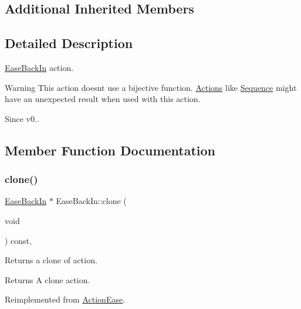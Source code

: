 \subsection*{Additional Inherited Members}


\subsection{Detailed Description}
\hyperlink{classEaseBackIn}{Ease\+Back\+In} action. 

\begin{DoxyWarning}{Warning}
This action doesn\textquotesingle{}t use a bijective function. \hyperlink{classActions}{Actions} like \hyperlink{classSequence}{Sequence} might have an unexpected result when used with this action. 
\end{DoxyWarning}
\begin{DoxySince}{Since}
v0.. 
\end{DoxySince}


\subsection{Member Function Documentation}
\mbox{\label{classEaseBackIn_a2f409b8e89fc64d521a6268ff701045d}} 
\subsubsection{\texorpdfstring{clone()}{clone()}}
{\footnotesize\ttfamily \hyperlink{classEaseBackIn}{Ease\+Back\+In} $\ast$ Ease\+Back\+In\+::clone (\begin{DoxyParamCaption}\item[{void}]{ }\end{DoxyParamCaption}) const\hspace{0.3cm}{\ttfamily [override]}, {\ttfamily [virtual]}}

Returns a clone of action.

\begin{DoxyReturn}{Returns}
A clone action. 
\end{DoxyReturn}


Reimplemented from \hyperlink{classActionEase_a39bec93fe161fb732a74d8e51a2fe08b}{Action\+Ease}.

\mbox{\label{classEaseBackIn_a3ea9ee4daccf7309a42c019f9cd40461}} 
